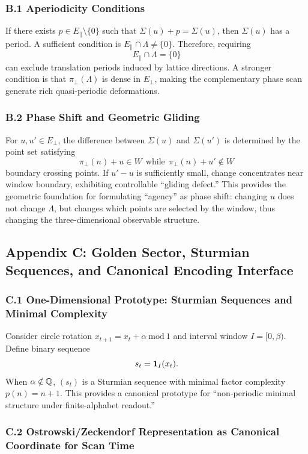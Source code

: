 \subsubsection{B.1 Aperiodicity Conditions}

If there exists $p\in E_{\parallel}\setminus\{0\}$ such that $\Sigma(u)+p=\Sigma(u)$, then $\Sigma(u)$ has a period. A sufficient condition is $E_{\parallel}\cap\Lambda\neq\{0\}$. Therefore, requiring
\[
E_{\parallel}\cap\Lambda=\{0\}
\]
can exclude translation periods induced by lattice directions. A stronger condition is that $\pi_{\perp}(\Lambda)$ is dense in $E_{\perp}$, making the complementary phase scan generate rich quasi-periodic deformations.

\subsubsection{B.2 Phase Shift and Geometric Gliding}

For $u,u'\in E_{\perp}$, the difference between $\Sigma(u)$ and $\Sigma(u')$ is determined by the point set satisfying
\[
\pi_{\perp}(n)+u\in W\ \ \text{while}\ \ \pi_{\perp}(n)+u'\notin W
\]
boundary crossing points. If $u'-u$ is sufficiently small, change concentrates near window boundary, exhibiting controllable ``gliding defect.'' This provides the geometric foundation for formulating ``agency'' as phase shift: changing $u$ does not change $\Lambda$, but changes which points are selected by the window, thus changing the three-dimensional observable structure.

\subsection{Appendix C: Golden Sector, Sturmian Sequences, and Canonical Encoding Interface}

\subsubsection{C.1 One-Dimensional Prototype: Sturmian Sequences and Minimal Complexity}

Consider circle rotation $x_{t+1}=x_t+\alpha\ \mathrm{mod}\ 1$ and interval window $I=[0,\beta)$. Define binary sequence
\[
s_t=\mathbf{1}_I(x_t).
\]
When $\alpha\notin\mathbb{Q}$, $(s_t)$ is a Sturmian sequence with minimal factor complexity $p(n)=n+1$. This provides a canonical prototype for ``non-periodic minimal structure under finite-alphabet readout.''

\subsubsection{C.2 Ostrowski/Zeckendorf Representation as Canonical Coordinate for Scan Time}

